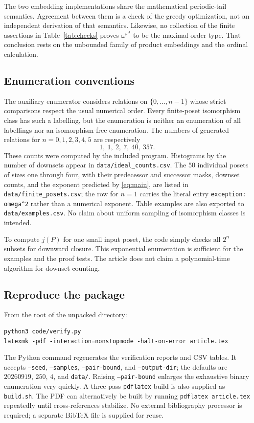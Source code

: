 \documentclass[11pt,a4paper]{article}
\numberwithin{equation}{section}
\theoremstyle{definition}
\theoremstyle{remark}
\begin{document}
The two embedding implementations share the mathematical periodic-tail
semantics. Agreement between them is a check of the greedy optimization,
not an independent derivation of that semantics. Likewise, no collection
of the finite assertions in Table~\ref{tab:checks} proves
$\omega^{\omega^4}$ to be the maximal order type. That conclusion rests on
the unbounded family of product embeddings and the ordinal calculation.

\subsection{Enumeration conventions}
The auxiliary enumerator considers relations on $\{0,\ldots,n-1\}$ whose
strict comparisons respect the usual numerical order. Every finite-poset
isomorphism class has such a labelling, but the enumeration is neither an
enumeration of all labellings nor an isomorphism-free enumeration. The
numbers of generated relations for $n=0,1,2,3,4,5$ are respectively
\[
 1,\ 1,\ 2,\ 7,\ 40,\ 357.
\]
These counts were computed by the included program. Histograms by the
number of downsets appear in \texttt{data/ideal\_counts.csv}. The $50$
individual posets of sizes one through four, with their predecessor and
successor masks, downset counts, and the exponent predicted by
\eqref{eq:main}, are listed in \texttt{data/finite\_posets.csv}; the row for
$n=1$ carries the literal entry \texttt{exception: omega\^{}2} rather than a
numerical exponent. Table examples are also exported to
\texttt{data/examples.csv}. No claim about uniform sampling of isomorphism
classes is intended.

To compute $j(P)$ for one small input poset, the code simply checks all
$2^n$ subsets for downward closure. This exponential enumeration is
sufficient for the examples and the proof tests. The article does not
claim a polynomial-time algorithm for downset counting.

\subsection{Reproduce the package}
From the root of the unpacked directory:
\begin{lstlisting}
python3 code/verify.py
latexmk -pdf -interaction=nonstopmode -halt-on-error article.tex
\end{lstlisting}
The Python command regenerates the verification reports and CSV tables.
It accepts \texttt{--seed}, \texttt{--samples}, \texttt{--pair-bound}, and
\texttt{--output-dir}; the defaults are $20260919$, $250$, $4$, and
\texttt{data/}. Raising \texttt{--pair-bound} enlarges the exhaustive binary
enumeration very quickly. A three-pass \texttt{pdflatex} build is also
supplied as \texttt{build.sh}.
The PDF can alternatively be built by running \texttt{pdflatex article.tex}
repeatedly until cross-references stabilize. No external bibliography
processor is required; a separate BibTeX file is supplied for reuse.
\end{document}
